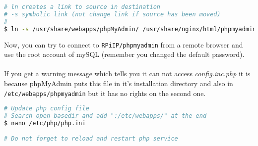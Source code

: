 \begin{lstlisting}[language=bash,caption=Configure phpMyAdmin]
# ln creates a link to source in destination
# -s symbolic link (not change link if source has been moved)
#
$ ln -s /usr/share/webapps/phpMyAdmin/ /usr/share/nginx/html/phpmyadmin
\end{lstlisting} 

Now, you can try to connect to \texttt{RPiIP/phpmyadmin} from a remote 
browser and use the root account of mySQL (remember you changed the default 
password).
\\\\
If you get a warning message which tells you it can not access 
\emph{config.inc.php} it is because phpMyAdmin puts this file in it's 
installation directory and also in \texttt{/etc/webapps/phpmyadmin} but it has 
no rights on the second one.

\begin{lstlisting}[language=bash,caption=Fix phpMyAdmin troubles]
# Update php config file
# Search open_basedir and add ":/etc/webapps/" at the end
$ nano /etc/php/php.ini

# Do not forget to reload and restart php service
\end{lstlisting} 
%
